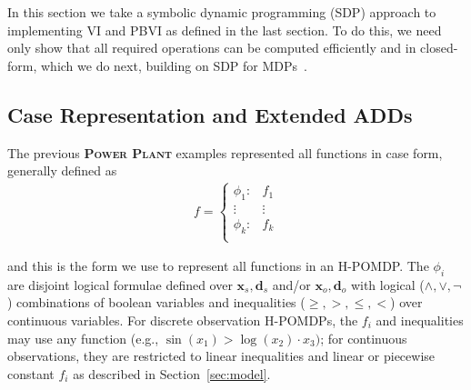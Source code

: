 \documentclass{article} %
\newcommand{\xds}{\mathbf{x}_s,\!\mathbf{d}_s}
\newcommand{\xdo}{\mathbf{x}_o,\!\mathbf{d}_o}
\begin{document}
In this section we take a symbolic dynamic programming (SDP) approach
to implementing VI and PBVI as defined in the last section.  To do this,
we need only show that all required operations can be computed efficiently
and in closed-form, which we do next, building on SDP for 
MDPs~\cite{sanner_uai11}.  

\subsection{Case Representation and Extended ADDs}
\label{sec:case}

The previous \textsc{\bf Power Plant} examples represented all functions in case form,
generally defined as {\footnotesize
\vspace{-1mm}
\begin{align}
f = 
\begin{cases}
  \phi_1: & f_1 \\ 
 \vdots&\vdots\\ 
  \phi_k: & f_k \\ 
\end{cases} \nonumber
\end{align}
\vspace{-4mm}
}

and this is the form we use to represent all functions in an H-POMDP.
The $\phi_i$ are disjoint logical formulae defined over $\xds$ and/or $\xdo$ with logical ($\land,\lor,\neg$) combinations of boolean variables and inequalities ($\geq,>,\leq,<$) over continuous variables.  
For discrete observation H-POMDPs, the $f_i$ and inequalities may use any function (e.g., $\sin(x_1) > \log(x_2)\cdot x_3)$; for continuous observations, they are restricted to linear inequalities and linear or piecewise constant $f_i$ as described in Section~\ref{sec:model}.
\end{document}
